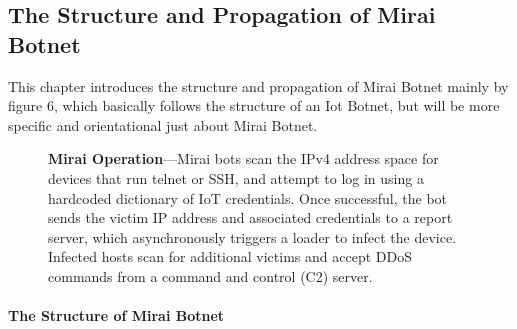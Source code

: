 \documentclass[conference]{IEEEtran}
\begin{document}
\subsection{\textbf{The Structure and Propagation of Mirai Botnet}}
This chapter introduces the structure and propagation of Mirai Botnet mainly by figure 6\cite{b1}, which basically follows the structure of an Iot Botnet, but will be more specific and orientational just about Mirai Botnet.

\begin{figure}[htbp]
\caption{\textbf{Mirai Operation}—Mirai bots scan the IPv4 address
space for devices that run telnet or SSH, and attempt to log in using
a hardcoded dictionary of IoT credentials. Once successful,
the bot sends the victim IP address and associated credentials to
a report server, which asynchronously triggers a loader to infect
the device. Infected hosts scan for additional victims and accept
DDoS commands from a command and control (C2) server.\cite{b1}}
\label{fig}
\end{figure}

\paragraph{\textbf{The Structure  of Mirai Botnet}}\\
\end{document}
